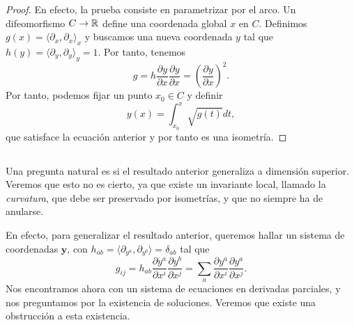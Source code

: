 \documentclass[11pt,a4paper]{amsbook}
\theoremstyle{remark} \newtheorem{rmk}[subsection]{Observación}
\theoremstyle{definition} \newtheorem{defn}[subsection]{Definición}
\theoremstyle{definition} \newtheorem{ex}[subsection]{Ejemplo}
\theoremstyle{definition} \newtheorem{ej}[subsection]{Ejercicio}
\begin{document}
\begin{proof}
  En efecto, la prueba consiste en parametrizar por el arco. Un difeomorfismo $C\rightarrow \mathbb R$ define una coordenada global $x$ en $C$. Definimos $g(x)=\langle \partial_x,\partial_x\rangle_x$ y buscamos una nueva coordenada $y$ tal que $h(y)=\langle \partial_y,\partial_y\rangle_y=1$. Por tanto, tenemos
  \begin{equation*}
g = h \frac{\partial y}{\partial x} \frac{\partial y}{\partial x} = \left( \frac{\partial y}{\partial x} \right)^2.
  \end{equation*}
  Por tanto, podemos fijar un punto $x_0 \in C$ y definir
  \begin{equation*}
y(x) = \int_{x_0}^x \sqrt{g(t)} dt,
  \end{equation*}
que satisface la ecuación anterior y por tanto es una isometría.
\end{proof}

\subsection{} Una pregunta natural es si el resultado anterior generaliza a dimensión superior. Veremos que esto no es cierto, ya que existe un invariante local, llamado la \emph{curvatura}, que debe ser preservado por isometrías, y que no siempre ha de anularse.

En efecto, para generalizar el resultado anterior, queremos hallar un sistema de coordenadas $\bm{y}$, con $h_{ab}=\langle \partial_{y^a},\partial_{y^b} \rangle = \delta_{ab}$ tal que
\begin{equation*}
g_{ij} = h_{ab} \frac{\partial y^a}{\partial x^i} \frac{\partial y^b}{\partial x^j} = \sum_a \frac{\partial y^a}{\partial x^i} \frac{\partial y^a}{\partial x^j}.
\end{equation*}
Nos encontramos ahora con un sistema de ecuaciones en derivadas parciales, y nos preguntamos por la existencia de soluciones. Veremos que existe una obstrucción a esta existencia.
\end{document}
